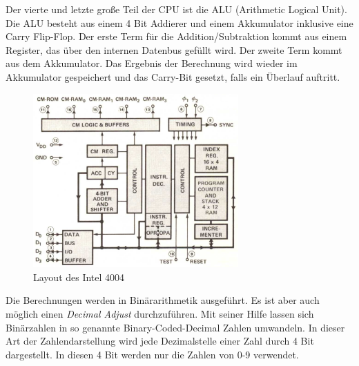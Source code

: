 Der vierte und letzte große Teil der CPU ist die ALU (Arithmetic Logical Unit). Die ALU besteht aus einem 4 Bit Addierer und einem Akkumulator inklusive eine Carry Flip-Flop. Der erste Term für die Addition/Subtraktion kommt aus einem Register, das über den internen Datenbus gefüllt wird. Der zweite Term kommt aus dem Akkumulator. Das Ergebnis der Berechnung wird wieder im Akkumulator gespeichert und das Carry-Bit gesetzt, falls ein Überlauf auftritt.
 \begin{figure}[h]
 	\centering
 	\includegraphics[width=0.7\textwidth]{figures/layout_4004.png}
 	\caption{Layout des Intel 4004}
 	\label{fig:layout_4004}
 \end{figure}
Die Berechnungen werden in Binärarithmetik ausgeführt. Es ist aber auch möglich einen \textit{Decimal Adjust} durchzuführen. Mit seiner Hilfe lassen sich Binärzahlen in so genannte Binary-Coded-Decimal Zahlen umwandeln. In dieser Art der Zahlendarstellung wird jede Dezimalstelle einer Zahl durch 4 Bit dargestellt. In diesen 4 Bit werden nur die Zahlen von 0-9 verwendet.

